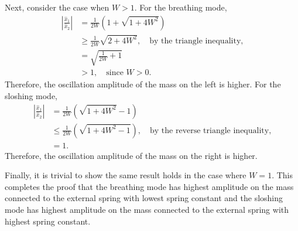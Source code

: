 \documentclass[12pt]{../style-files/ociamthesis}
\begin{document}
Next, consider the case when $W > 1$. For the breathing mode,
\begin{align}
\left| \frac{\hat{x}_1}{\hat{x}_2} \right| & = \frac{1}{2W} \left(1 + \sqrt{1 + 4W^2}\right) \\
& \geq \frac{1}{2W} \sqrt{2 + 4W^2}, \quad \text{by the triangle inequality,} \\
& = \sqrt{\frac{1}{2W} + 1} \\
& > 1,  \quad \text{since $W > 0$.}
\end{align}
Therefore, the oscillation amplitude of the mass on the left is higher. For the sloshing mode,
\begin{align}
\left| \frac{\hat{x}_1}{\hat{x}_2} \right| & = \frac{1}{2W} \left(\sqrt{1 + 4W^2} - 1\right) \\
& \leq \frac{1}{2W} \left(\sqrt{1 + 4W^2 - 1}\right), \quad \text{by the reverse triangle inequality,} \\
& = 1.
\end{align}
Therefore, the oscillation amplitude of the mass on the right is higher.

Finally, it is trivial to show the same result holds in the case where $W = 1$. This completes the proof that the breathing mode has highest amplitude on the mass connected to the external spring with lowest spring constant and the sloshing mode has highest amplitude on the mass connected to the external spring with highest spring constant.



  
\end{document}
